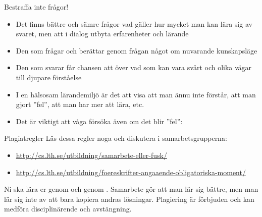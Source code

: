 \documentclass{lecturenotes}
\begin{document}

\begin{Slide}{Bestraffa inte frågor!}
\begin{itemize}
\item Det finns bättre och sämre frågor vad gäller hur mycket man kan lära sig av svaret, men  att i dialog utbyta erfarenheter och lärande
\item Den som frågar  och berättar genom frågan något om nuvarande kunskapsläge
\item Den som svarar får chansen att  över vad som kan vara svårt och olika vägar till djupare förståelse
\item I en hälsosam lärandemiljö är det  att visa att man ännu inte förstår, att man gjort ''fel'', att man har mer att lära, etc. 
\item Det är viktigt att våga försöka även om det blir ''fel'':\\ 
\end{itemize}
\end{Slide}

\begin{Slide}{Plagiatregler}
Läs dessa regler noga och diskutera i samarbetsgrupperna:
\begin{itemize}
\footnotesize
\item \url{http://cs.lth.se/utbildning/samarbete-eller-fusk/}
\item \url{http://cs.lth.se/utbildning/foereskrifter-angaaende-obligatoriska-moment/}
\end{itemize}
Ni ska lära er genom  och genom  . Samarbete gör att man lär sig bättre, men man lär sig inte av att bara kopiera andras lösningar. Plagiering är förbjuden och kan medföra disciplinärende och avstängning.
\end{Slide}
\end{document}
